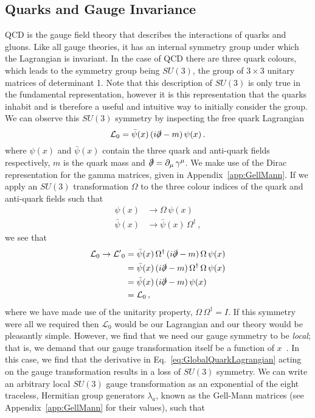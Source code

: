 \subsection{Quarks and Gauge Invariance}
QCD is the gauge field theory that describes the interactions of quarks and gluons. Like all gauge theories, it has an internal symmetry group under which the Lagrangian is invariant. In the case of QCD there are three quark colours, which leads to the symmetry group being $SU(3)$, the group of $3\times 3$ unitary matrices of determinant 1. Note that this description of $SU(3)$ is only true in the fundamental representation, however it is this representation that the quarks inhabit and is therefore a useful and intuitive way to initially consider the group. We can observe this $SU(3)$ symmetry by inspecting the free quark Lagrangian
%
\begin{equation}
\mathcal{L}_0 = \bar{\psi}(x)\,(i\slashed{\partial}-m)\,\psi(x)\,.
\label{eq:GlobalQuarkLagrangian}
\end{equation}
%
where $\psi(x)$ and $\bar{\psi}(x)$ contain the three quark and anti-quark fields respectively, $m$ is the quark mass and $\slashed{\partial}=\partial_\mu\,\gamma^\mu$. We make use of the Dirac representation for the gamma matrices, given in Appendix~\ref{app:GellMann}. If we apply an $SU(3)$ transformation $\Omega$ to the three colour indices of the quark and anti-quark fields such that
%
\begin{align}
\psi(x)&\rightarrow\Omega\,\psi(x)\\
\bar{\psi}(x)&\rightarrow \bar{\psi}(x)\,\Omega^\dagger\, ,
\end{align}
%
we see that
%
\begin{align}
\mathcal{L}_0\rightarrow\mathcal{L'}_0&=\bar{\psi}(x)\,\Omega^\dag\,(i\slashed{\partial}-m)\,\Omega\,\psi(x)\nonumber\\
&= \bar{\psi}(x)\,(i\slashed{\partial}-m)\,\Omega^\dag\,\Omega\,\psi(x)\nonumber\\
&= \bar{\psi}(x)\,(i\slashed{\partial}-m)\,\psi(x)\nonumber\\
&= \mathcal{L}_0\, ,
\end{align}
%
where we have made use of the unitarity property, $\Omega\,\Omega^\dag = I$. If this symmetry were all we required then $\mathcal{L}_0$ would be our Lagrangian and our theory would be pleasantly simple. However, we find that we need our gauge symmetry to be \textit{local}; that is, we demand that our gauge transformation itself be a function of $x$~\cite{peskin2018introduction}. In this case, we find that the derivative in Eq.~\eqref{eq:GlobalQuarkLagrangian} acting on the gauge transformation results in a loss of $SU(3)$ symmetry. We can write an arbitrary local $SU(3)$ gauge transformation as an exponential of the eight traceless, Hermitian group generators $\lambda_a$, known as the Gell-Mann matrices (see Appendix~\ref{app:GellMann} for their values), such that 
